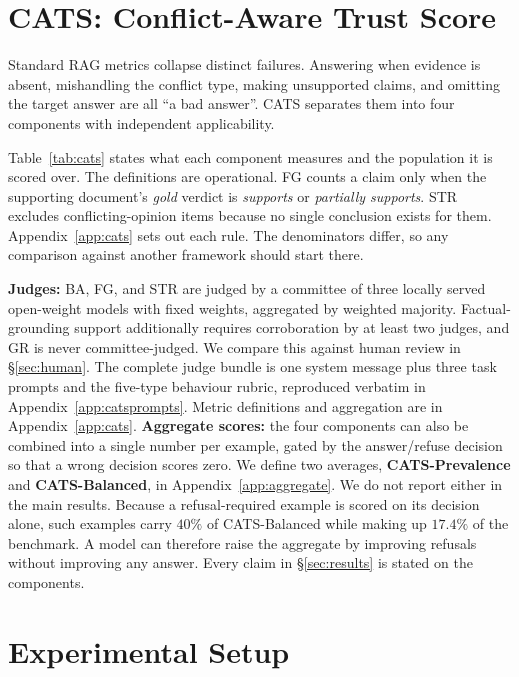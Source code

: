 \section{CATS: Conflict-Aware Trust Score}
\label{sec:cats}

Standard RAG metrics collapse distinct failures. Answering when evidence is
absent, mishandling the conflict type, making unsupported claims, and omitting
the target answer are all ``a bad answer''. CATS separates them into four
components with independent applicability.

Table~\ref{tab:cats} states what each component measures and the population it is
scored over. The definitions are operational. FG counts a claim only when the
supporting document's \emph{gold} verdict is \textit{supports} or \textit{partially
supports}. STR excludes conflicting-opinion items because no single conclusion
exists for them. Appendix~\ref{app:cats} sets out each rule. The denominators
differ, so any comparison against another framework should start there.

\textbf{Judges:} BA, FG, and STR are judged by a committee of three locally
served open-weight models with fixed weights, aggregated by weighted majority.
Factual-grounding support additionally requires corroboration by at least two
judges, and GR is never committee-judged. We compare this against human review
in \S\ref{sec:human}. The complete judge bundle is one system message plus
three task prompts and the five-type behaviour rubric, reproduced verbatim in
Appendix~\ref{app:catsprompts}. Metric definitions and aggregation are in
Appendix~\ref{app:cats}. \textbf{Aggregate scores:} the four components can also be combined into a
single number per example, gated by the answer/refuse decision so that a wrong
decision scores zero. We define two averages, \textbf{CATS-Prevalence} and
\textbf{CATS-Balanced}, in Appendix~\ref{app:aggregate}. We do not report
either in the main results. Because a refusal-required example is scored on
its decision alone, such examples carry $40\%$ of CATS-Balanced while making
up $17.4\%$ of the benchmark. A model can therefore raise the aggregate by
improving refusals without improving any answer. Every claim in
\S\ref{sec:results} is stated on the components.

\section{Experimental Setup}
\label{sec:setup}

